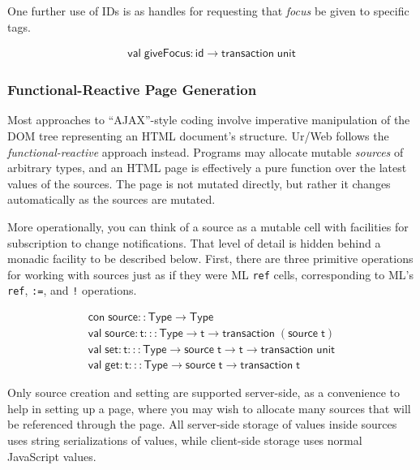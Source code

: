 \documentclass{article}
\newcommand{\cd}[1]{\texttt{#1}}
\newcommand{\mt}[1]{\mathsf{#1}}
\begin{document}
One further use of IDs is as handles for requesting that \emph{focus} be given to specific tags.

$$\begin{array}{l}
  \mt{val} \; \mt{giveFocus} : \mt{id} \to \mt{transaction} \; \mt{unit}
\end{array}$$

\subsubsection{\label{signals}Functional-Reactive Page Generation}

Most approaches to ``AJAX''-style coding involve imperative manipulation of the DOM tree representing an HTML document's structure.  Ur/Web follows the \emph{functional-reactive} approach instead.  Programs may allocate mutable \emph{sources} of arbitrary types, and an HTML page is effectively a pure function over the latest values of the sources.  The page is not mutated directly, but rather it changes automatically as the sources are mutated.

More operationally, you can think of a source as a mutable cell with facilities for subscription to change notifications.  That level of detail is hidden behind a monadic facility to be described below.  First, there are three primitive operations for working with sources just as if they were ML \cd{ref} cells, corresponding to ML's \cd{ref}, \cd{:=}, and \cd{!} operations.

$$\begin{array}{l}
  \mt{con} \; \mt{source} :: \mt{Type} \to \mt{Type} \\
  \mt{val} \; \mt{source} : \mt{t} ::: \mt{Type} \to \mt{t} \to \mt{transaction} \; (\mt{source} \; \mt{t}) \\
  \mt{val} \; \mt{set} : \mt{t} ::: \mt{Type} \to \mt{source} \; \mt{t} \to \mt{t} \to \mt{transaction} \; \mt{unit} \\
  \mt{val} \; \mt{get} : \mt{t} ::: \mt{Type} \to \mt{source} \; \mt{t} \to \mt{transaction} \; \mt{t}
\end{array}$$

Only source creation and setting are supported server-side, as a convenience to help in setting up a page, where you may wish to allocate many sources that will be referenced through the page.  All server-side storage of values inside sources uses string serializations of values, while client-side storage uses normal JavaScript values.
\end{document}
